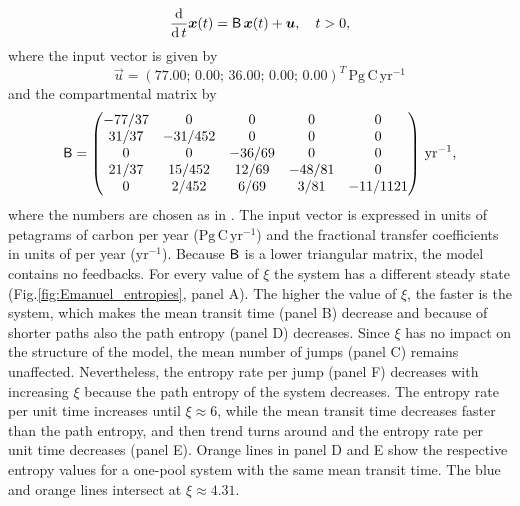 \documentclass[smallextended]{svjour3}
\newcommand{\deriv}[1]{\frac{\operatorname{d}}{\operatorname{d}#1}}
\newcommand{\peta}{\mathrm{P}}
\newcommand{\gC}{\mathrm{g\,C}}
\newcommand{\yr}{\mathrm{yr}}
\newcommand{\transpose}{T}
\begin{document}
\begin{equation*}
    \deriv{t}\vec{x}(t) = \tens{B}\,\vec{x}(t) + \vec{u},\quad t>0,
\end{equation*}
where the input vector is given by 
\begin{equation*}
  \vec{u} = (77.00;\,0.00;\,36.00;\,0.00;\,0.00)^{\transpose}\, \peta\gC\,\yr^{-1}
\end{equation*}
and the compartmental matrix by
\begin{equation*}
    \tens{B} = \left(\begin{matrix}
      -77/37 &       0 &      0 &      0 & 	  0\\
       31/37 & -31/452 &      0 &      0 & 	  0\\
	   0 &       0 & -36/69 &      0 & 	  0\\
       21/37 &  15/452 &  12/69 & -48/81 & 	  0\\
	   0 &   2/452 &   6/69 &   3/81 & -11/1121
	 \end{matrix}\right)\,\yr^{-1},
\end{equation*}
where the numbers are chosen as in \citet{Thompson1999GCB}. 
The input vector is expressed in units of petagrams of carbon per year ($\peta\gC\,\yr^{-1}$) and the fractional transfer coefficients in units of per year ($\yr^{-1}$).
Because $\mathsf{B}$ is a lower triangular matrix, the model contains no feedbacks.
For every value of $\xi$ the system has a different steady state (Fig.\ref{fig:Emanuel_entropies}, panel A).
The higher the value of $\xi$, the faster is the system, which makes the mean transit time (panel B) decrease and because of shorter paths also the path entropy (panel D) decreases.
Since $\xi$ has no impact on the structure of the model, the mean number of jumps (panel C) remains unaffected.
Nevertheless, the entropy rate per jump (panel F) decreases with increasing $\xi$ because the path entropy of the system decreases.
The entropy rate per unit time increases until $\xi\approx6$, while the mean transit time decreases faster than the path entropy, and then trend turns around and the entropy rate per unit time decreases (panel E).
Orange lines in panel D and E show the respective entropy values for a one-pool system with the same mean transit time.
The blue and orange lines intersect at $\xi\approx4.31$.
\end{document}
